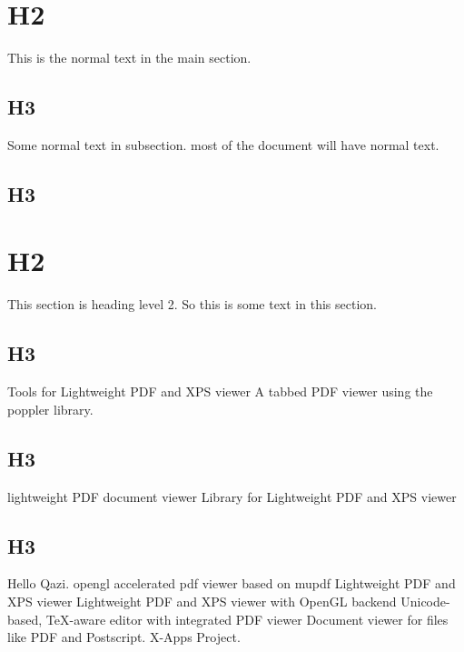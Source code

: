 \documentclass{article}
\begin{document}
\section{H2}
This is the normal text in the main section. 
\subsection{H3}
Some normal text in subsection. most of the document will have normal text. 
\subsection{H3}
\section{H2}
This section is heading level 2. So this is some text in this section.
\subsection{H3}
    Tools for Lightweight PDF and XPS viewer
    A tabbed PDF viewer using the poppler library.
\subsection{H3}
    lightweight PDF document viewer
    Library for Lightweight PDF and XPS viewer
\subsection{H3}
Hello Qazi.
    opengl accelerated pdf viewer based on mupdf
    Lightweight PDF and XPS viewer
    Lightweight PDF and XPS viewer with OpenGL backend
    Unicode-based, TeX-aware editor with integrated PDF viewer
    Document viewer for files like PDF and Postscript. X-Apps Project.
\end{document}
